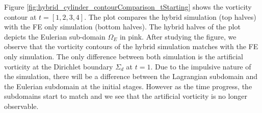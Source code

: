 Figure \ref{fig:hybrid_cylinder_contourComparison_tStarting} shows the vorticity contour at $t = [1,2,3,4]$. The plot compares the hybrid simulation (top halves) with the FE only simulation (bottom halves). The hybrid halves of the plot depicts the Eulerian sub-domain $\Omega_E$ in pink. After studying the figure, we observe that the vorticity contours of the hybrid simulation matches with the FE only simulation. The only difference between both simulation is the artificial vorticity at the Dirichlet boundary $\Sigma_d$ at $t=1$. Due to the impulsive nature of the simulation, there will be a difference between the Lagrangian subdomain and the Eulerian subdomain at the initial stages. However as the time progress, the subdomains start to match and we see that the artificial vorticity is no longer observable.






